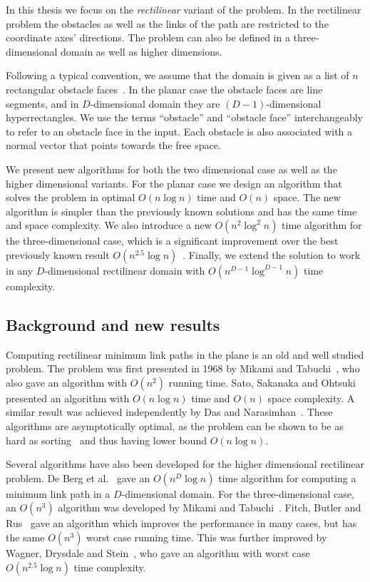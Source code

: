 \documentclass[english,gradu]{tktltiki2018}
\begin{document}
In this thesis we focus on the \emph{rectilinear} variant of the problem.
In the rectilinear problem the obstacles as well as the links of the path are restricted to the coordinate axes' directions.
The problem can also be defined in a three-dimensional domain as well as higher dimensions.

Following a typical convention, we assume that the domain is given as a list of $n$ rectangular obstacle faces~\cite{wagnerphd}.
In the planar case the obstacle faces are line segments, and in $D$-dimensional domain they are $(D-1)$-dimensional hyperrectangles.
We use the terms ``obstacle'' and ``obstacle face'' interchangeably to refer to an obstacle face in the input.
Each obstacle is also associated with a normal vector that points towards the free space.

We present new algorithms for both the two dimensional case as well as the higher dimensional variants.
For the planar case we design an algorithm that solves the problem in optimal $O(n\log n)$ time and $O(n)$ space.
The new algorithm is simpler than the previously known solutions and has the same time and space complexity.
We also introduce a new $O(n^2\log^2 n)$ time algorithm for the three-dimensional case, which is a significant improvement over the best previously known result $O(n^{2.5}\log n)$~\cite{restricted}.
Finally, we extend the solution to work in any $D$-dimensional rectilinear domain with $O(n^{D-1}\log^{D-1}n)$ time complexity.

\subsection{Background and new results}

Computing rectilinear minimum link paths in the plane is an old and well studied problem.
The problem was first presented in 1968 by Mikami and Tabuchi~\cite{mikami}, who also gave an algorithm with $O(n^2)$ running time.
Sato, Sakanaka and Ohtsuki~\cite{sato} presented an algorithm with $O(n\log n)$ time and $O(n)$ space complexity.
A similar result was achieved independently by Das and Narasimhan~\cite{dasnar}.
These algorithms are asymptotically optimal, as the problem can be shown to be as hard as sorting~\cite{dasnar} and thus having lower bound $O(n\log n)$.

Several algorithms have also been developed for the higher dimensional rectilinear problem.
De Berg et al.~\cite{de1992} gave an $O(n^D\log n)$ time algorithm for computing a minimum link path in a $D$-dimensional domain.
For the three-dimensional case, an $O(n^3)$ algorithm was developed by Mikami and Tabuchi~\cite{mikami}.
Fitch, Butler and Rus~\cite{fitch} gave an algorithm which improves the performance in many cases, but has the same $O(n^3)$ worst case running time.
This was further improved by Wagner, Drysdale and Stein~\cite{wagner}, who gave an algorithm with worst case $O(n^{2.5}\log n)$ time complexity.
\end{document}
